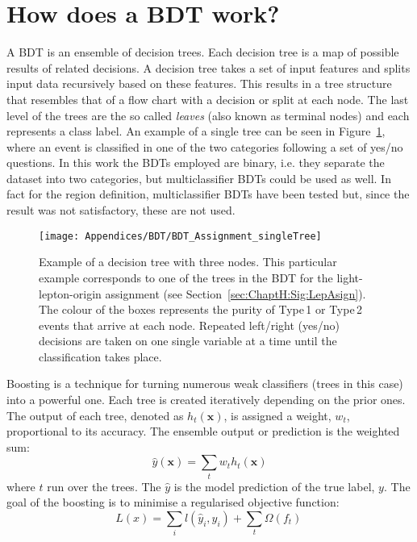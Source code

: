 \section{How does a BDT work?}
\label{chap:Appendix:BDT:Basics}
A BDT is an ensemble of decision trees. Each decision tree is a map of possible results of related decisions. 
A decision tree takes a set of input features and splits input data recursively based on these features. 
This results in a tree structure that resembles that of a flow chart with a decision or split at each node.
The last level of the trees are the so called \textit{leaves} (also known as terminal nodes) and each represents a class label.
An example of a single tree can be seen in Figure~\ref{fig:Appendix:BDT:TreeExample}, where an event is classified in one of the two 
categories following a set of yes/no questions. In this work the BDTs employed are binary, i.e. they separate the dataset into two categories, 
but multiclassifier BDTs could be used as well. In fact for the region definition, multiclassifier BDTs have been
tested but, since the result was not satisfactory, these are not used. 

\begin{figure}
\centering
  \centering
  \texttt{[image: Appendices/BDT/BDT\_Assignment\_singleTree]}
\caption{Example of a decision tree with three nodes. This particular example corresponds to one of the trees in the BDT for the 
light-lepton-origin assignment (see Section~\ref{sec:ChaptH:Sig:LepAsign}). The colour of the boxes represents the 
purity of Type$\,$1 or Type$\,$2 events that arrive at each node. Repeated left/right (yes/no) decisions are taken on 
one single variable at a time until the classification takes place.}
\label{fig:Appendix:BDT:TreeExample}
\end{figure}

Boosting is a technique for turning numerous weak classifiers (trees in this case) into a powerful one. 
Each tree is created iteratively depending on the prior ones. The output of each tree, denoted as $h_{t}(\bm{x})$, 
is assigned a weight, $w_{t}$,
proportional to its accuracy. The ensemble output or prediction is the weighted sum:
\begin{equation*}
	\hat{y} (\bm{x}) = \sum_{t} w_{t}h_{t}(\bm{x})
\end{equation*}
where $t$ run over the trees. 
The $\hat{y}$ is the model prediction of the true label, $y$.
The goal of the boosting is to minimise a regularised objective function:
\begin{equation}
\label{eq:Appendix:BDT:ObjectiveFunction}
	L (x) = \sum_{i} l(\hat{y}_{i}, y_{i})+ \sum_{t}\Omega(f_{t}) \,
\end{equation}

